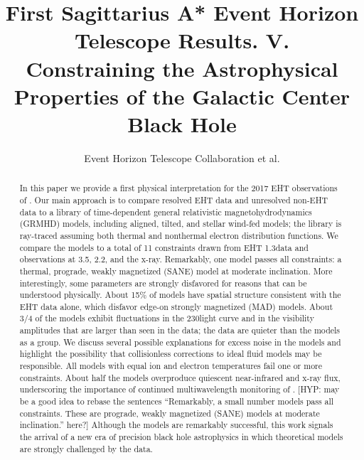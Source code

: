 \documentclass[twocolumn,twocolappendix,tighten,dvipsnames,linenumbers]{aastex63}
\newcommand\hyp[1]{{\color{Salmon}[HYP: #1]}}
\begin{document}
\title{First Sagittarius A* Event Horizon Telescope Results. V.\\
  Constraining the Astrophysical Properties of the Galactic Center Black Hole}

%
\author{Event Horizon Telescope Collaboration et al.}


\received{\today}
\revised{\today}

\begin{abstract}
  In this paper we provide a first physical interpretation for the
  2017 EHT observations of \sgra.
  Our main approach is to compare resolved EHT data and unresolved
  non-EHT data to a library of time-dependent general relativistic
  magnetohydrodynamics (GRMHD) models, including aligned, tilted, and
  stellar wind-fed models; the library is ray-traced assuming both
  thermal and nonthermal electron distribution functions.
  We compare the models to a total of 11 constraints drawn from EHT
  1.3\mm data and observations at 3.5\mm, 2.2\um, and the x-ray.
  Remarkably, one model passes all constraints: a thermal, prograde,
  weakly magnetized (SANE) model at moderate inclination.
  More interestingly, some parameters are strongly disfavored for
  reasons that can be understood physically.
  About 15\% of models have spatial structure consistent with the EHT
  data alone, which disfavor edge-on strongly magnetized (MAD) models.
  About 3/4 of the models exhibit fluctuations in the 230\GHz light
  curve and in the visibility amplitudes that are larger than seen in
  the data; the data are quieter than the models as a group.
  We discuss several possible explanations for excess noise in the
  models and highlight the possibility that collisionless corrections
  to ideal fluid models may be responsible.
  All models with equal ion and electron temperatures fail one or more
  constraints.
  About half the models overproduce quiescent near-infrared and x-ray
  flux, underscoring the importance of continued multiwavelength
  monitoring of \sgra.
  \hyp{may be a good idea to rebase the sentences ``Remarkably, a
    small number models pass all constraints.
    These are prograde, weakly magnetized (SANE) models at moderate
    inclination.'' here?}
  Although the models are remarkably successful, this work signals the
  arrival of a new era of precision black hole astrophysics in which
  theoretical models are strongly challenged by the data.
\end{abstract}
\end{document}
